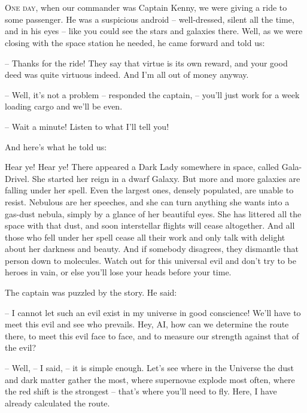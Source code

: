 \documentclass[ebook,oneside,final,openright]{memoir}
\begin{document}
\chapter{}
\par
\lettrine{O}{ne day,} when our commander was Captain Kenny, we were giving a ride to some passenger. He was a suspicious android – well-dressed, silent all the time, and in his eyes – like you could see the stars and galaxies there. Well, as we were closing with the space station he needed, he came forward and told us: \par
\par
– Thanks for the ride! They say that virtue is its own reward, and your good deed was quite virtuous indeed. And I’m all out of money anyway.\par
– Well, it’s not a problem – responded the captain, – you’ll just work for a week loading cargo and we’ll be even. \par
– Wait a minute! Listen to what I’ll tell you! \par
 And here’s what he told us:\par
\par
Hear ye! Hear ye! There appeared a Dark Lady somewhere in space, called Gala-Drivel. She started her reign in a dwarf Galaxy. But more and more galaxies are falling under her spell. Even the largest ones, densely populated, are unable to resist. Nebulous are her speeches, and she can turn anything she wants into a gas-dust nebula, simply by a glance of her beautiful eyes. She has littered all the space with that dust, and soon interstellar flights will cease altogether. And all those who fell under her spell cease all their work and only talk with delight about her darkness and beauty. And if somebody disagrees, they dismantle that person down to molecules. Watch out for this universal evil and don’t try to be heroes in vain, or else you’ll lose your heads before your time.\par
\par
The captain was puzzled by the story. He said:\par
– I cannot let such an evil exist in my universe in good conscience! We’ll have to meet this evil and see who prevails. Hey, AI, how can we determine the route there, to meet this evil face to face, and to measure our strength against that of the evil?\par
– Well, – I said, – it is simple enough. Let’s see where in the Universe the dust and dark matter gather the most, where supernovae explode most often, where the red shift is the strongest – that’s where you’ll need to fly. Here, I have already calculated the route.\par
\end{document}
